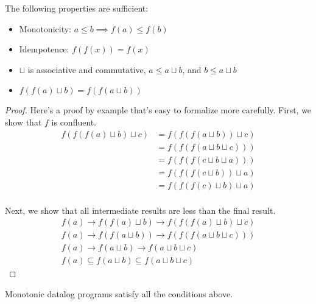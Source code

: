 \documentclass{mwhittaker}
\newcommand{\join}{\sqcup}
\begin{document}
\begin{claim}
  The following properties are sufficient:
  \begin{itemize}
    \item
      Monotonicity: $a \leq b \implies f(a) \leq f(b)$
    \item
      Idempotence: $f(f(x)) = f(x)$
    \item
      $\join$ is associative and commutative, $a \leq a \join b$, and $b \leq a
      \join b$
    \item
      $f(f(a) \join b) = f(f(a \join b))$
  \end{itemize}
\end{claim}
\begin{proof}
  Here's a proof by example that's easy to formalize more carefully. First, we
  show that $f$ is confluent.
  \begin{align*}
    f(f(f(a) \join b) \join c)
      &= f(f(f(a \join b)) \join c) \\
      &= f(f(f(a \join b \join c))) \\
      &= f(f(f(c \join b \join a))) \\
      &= f(f(f(c \join b)) \join a) \\
      &= f(f(f(c) \join b) \join a) \\
  \end{align*}

  Next, we show that all intermediate results are less than the final result.
  \begin{gather*}
    f(a) \to f(f(a) \join b) \to f(f(f(a) \join b) \join c) \\
    f(a) \to f(f(a \join b)) \to f(f(f(a \join b \join c))) \\
    f(a) \to f(a \join b) \to f(a \join b \join c) \\
    f(a) \subseteq f(a \join b) \subseteq f(a \join b \join c)
  \end{gather*}
\end{proof}

Monotonic datalog programs satisfy all the conditions above.
\end{document}
